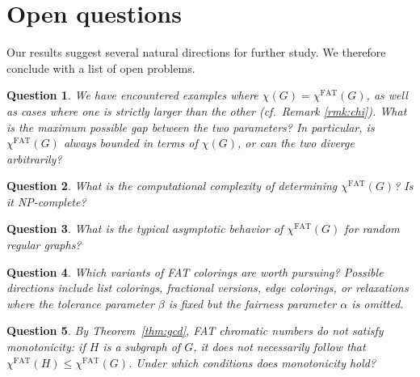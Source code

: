 \documentclass{article}
\theoremstyle{plain}
\newtheorem{question}{Question}
\theoremstyle{definition}
\theoremstyle{remark}
\begin{document}

\section{Open questions}\label{section:questions}

Our results suggest several natural directions for further study. We therefore conclude with a list of open problems.  


\begin{question}
We have encountered examples where $\chi(G)=\chi^{\mathrm{FAT}}(G)$, as well as cases where one is strictly larger than the other (cf.\ Remark \ref{rmk:chi}). What is the maximum possible gap between the two parameters? In particular, is $\chi^{\mathrm{FAT}}(G)$ always bounded in terms of $\chi(G)$, or can the two diverge arbitrarily?
\end{question}

\begin{question}
What is the computational complexity of determining $\chi^{\mathrm{FAT}}(G)$? Is it NP-complete?
\end{question}

\begin{question}
What is the typical asymptotic behavior of $\chi^{\mathrm{FAT}}(G)$ for random regular graphs?
\end{question}

\begin{question}
Which variants of FAT colorings are worth pursuing? Possible directions include list colorings, fractional versions, edge colorings, or relaxations where the tolerance parameter $\beta$ is fixed but the fairness parameter $\alpha$ is omitted.
\end{question}


\begin{question}
By Theorem~\ref{thm:gcd}, FAT chromatic numbers do not satisfy monotonicity: if $H$ is a subgraph of $G$, it does not necessarily follow that $\chi^{\mathrm{FAT}}(H)\leq \chi^{\mathrm{FAT}}(G)$. Under which conditions does monotonicity hold?
\end{question}
\end{document}
